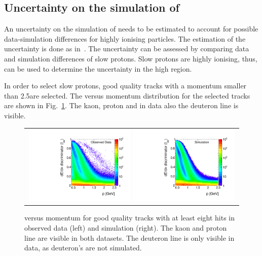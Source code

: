 \subsection*{Uncertainty on the simulation of \ias}
An uncertainty on the simulation of \ias needs to be estimated to account for possible data-simulation differences for highly ionising particles.
The estimation of the \ias uncertainty is done as in~\cite{bib:CMS:HSCP_8TeV,bib:CMS:HSCP_8TeV_AN}.
The \ias uncertainty can be assessed by comparing data and simulation differences of slow protons.
Slow protons are highly ionising, thus, can be used to determine the uncertainty in the high \ias region.

In order to select slow protons, good quality tracks with a momentum smaller than 2.5\gev are selected.
The \ias versus momentum distribution for the selected tracks are shown in Fig.~\ref{fig:IasVsMomentum}.
The kaon, proton and in data also the deuteron line is visible.
\begin{figure}[!h]
  \centering 
  \begin{tabular}{c}
    \includegraphics[width=0.49\textwidth]{figures/analysis/Interpretation/IasP_Data.pdf} 
    \includegraphics[width=0.49\textwidth]{figures/analysis/Interpretation/IasP_MC.pdf}
  \end{tabular}
  \caption{\ias versus momentum for good quality tracks with at least eight hits in observed data (left) and simulation (right).
           The kaon and proton line are visible in both datasets. The deuteron line is only visible in data, as deuteron's are not simulated.}
  \label{fig:IasVsMomentum}
\end{figure} 

